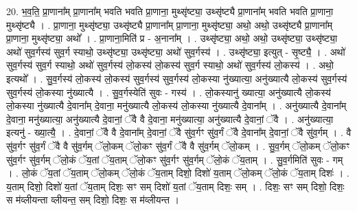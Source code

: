 \documentclass[17pt]{extarticle}
\begin{document}
20. भ॒व॒ति॒ प्रा॒णाना᳚म् प्रा॒णाना᳚म् भवति भवति प्रा॒णाना॒ मुथ्सृ॑ष्ट्या॒ उथ्सृ॑ष्ट्यै प्रा॒णाना᳚म् भवति भवति प्रा॒णाना॒ मुथ्सृ॑ष्ट्यै । . प्रा॒णाना॒ मुथ्सृ॑ष्ट्या॒ उथ्सृ॑ष्ट्यै प्रा॒णाना᳚म् प्रा॒णाना॒ मुथ्सृ॑ष्ट्या॒ अथो॒ अथो॒ उथ्सृ॑ष्ट्यै प्रा॒णाना᳚म् प्रा॒णाना॒ मुथ्सृ॑ष्ट्या॒ अथो᳚ । . प्रा॒णाना॒मिति॑ प्र - अ॒नाना᳚म् । . उथ्सृ॑ष्ट्या॒ अथो॒ अथो॒ उथ्सृ॑ष्ट्या॒ उथ्सृ॑ष्ट्या॒ अथो॑ सुव॒र्गस्य॑ सुव॒र्ग स्याथो॒ उथ्सृ॑ष्ट्या॒ उथ्सृ॑ष्ट्या॒ अथो॑ सुव॒र्गस्य॑ । . उथ्सृ॑ष्ट्या॒ इत्युत् - सृ॒ष्ट्यै॒ । . अथो॑ सुव॒र्गस्य॑ सुव॒र्ग स्याथो॒ अथो॑ सुव॒र्गस्य॑ लो॒कस्य॑ लो॒कस्य॑ सुव॒र्ग स्याथो॒ अथो॑ सुव॒र्गस्य॑ लो॒कस्य॑ । . अथो॒ इत्यथो᳚ । . सु॒व॒र्गस्य॑ लो॒कस्य॑ लो॒कस्य॑ सुव॒र्गस्य॑ सुव॒र्गस्य॑ लो॒कस्या नु॑ख्यात्या॒ अनु॑ख्यात्यै लो॒कस्य॑ सुव॒र्गस्य॑ सुव॒र्गस्य॑ लो॒कस्या नु॑ख्यात्यै । . सु॒व॒र्गस्येति॑ सुवः - गस्य॑ । . लो॒कस्यानु॑ ख्यात्या॒ अनु॑ख्यात्यै लो॒कस्य॑ लो॒कस्या नु॑ख्यात्यै दे॒वाना᳚म् दे॒वाना॒ मनु॑ख्यात्यै लो॒कस्य॑ लो॒कस्या नु॑ख्यात्यै दे॒वाना᳚म् । . अनु॑ख्यात्यै दे॒वाना᳚म् दे॒वाना॒ मनु॑ख्यात्या॒ अनु॑ख्यात्यै दे॒वानां॒ ॅवै वै दे॒वाना॒ मनु॑ख्यात्या॒ अनु॑ख्यात्यै दे॒वानां॒ ॅवै । . अनु॑ख्यात्या॒ इत्यनु॑ - ख्या॒त्यै॒ । . दे॒वानां॒ ॅवै वै दे॒वाना᳚म् दे॒वानां॒ ॅवै सु॑व॒र्गꣳ सु॑व॒र्गं ॅवै दे॒वाना᳚म् दे॒वानां॒ ॅवै सु॑व॒र्गम् । . वै सु॑व॒र्गꣳ सु॑व॒र्गं ॅवै वै सु॑व॒र्गम् ॅलो॒कम् ॅलो॒कꣳ सु॑व॒र्गं ॅवै वै सु॑व॒र्गम् ॅलो॒कम् । . सु॒व॒र्गम् ॅलो॒कम् ॅलो॒कꣳ सु॑व॒र्गꣳ सु॑व॒र्गम् ॅलो॒कं ॅय॒तां ॅय॒ताम् ॅलो॒कꣳ सु॑व॒र्गꣳ सु॑व॒र्गम् ॅलो॒कं ॅय॒ताम् । . सु॒व॒र्गमिति॑ सुवः - गम् । . लो॒कं ॅय॒तां ॅय॒ताम् ॅलो॒कम् ॅलो॒कं ॅय॒ताम् दिशो॒ दिशो॑ य॒ताम् ॅलो॒कम् ॅलो॒कं ॅय॒ताम् दिशः॑ । . य॒ताम् दिशो॒ दिशो॑ य॒तां ॅय॒ताम् दिशः॒ सꣳ सम् दिशो॑ य॒तां ॅय॒ताम् दिशः॒ सम् । . दिशः॒ सꣳ सम् दिशो॒ दिशः॒ स म॑व्लीयन्ता व्लीयन्त॒ सम् दिशो॒ दिशः॒ स म॑व्लीयन्त । \newline
\end{document}
